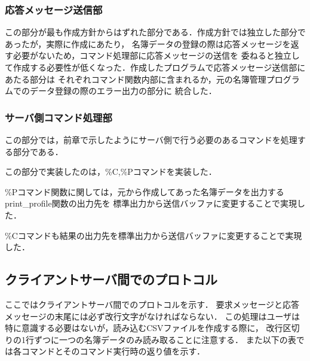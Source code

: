 \documentclass[a4paper,11pt]{jarticle}
\begin{document}
\subsubsection{応答メッセージ送信部} \label{sec:pre}
この部分が最も作成方針からはずれた部分である．作成方針では独立した部分であったが，実際に作成にあたり，
名簿データの登録の際は応答メッセージを返す必要がないため，コマンド処理部に応答メッセージの送信を
委ねると独立して作成する必要性が低くなった．作成したプログラムで応答メッセージ送信部にあたる部分は
それぞれコマンド関数内部に含まれるか，元の名簿管理プログラムでのデータ登録の際のエラー出力の部分に
統合した．

\subsubsection{サーバ側コマンド処理部} \label{sec:pre}
この部分では，前章で示したようにサーバ側で行う必要のあるコマンドを処理する部分である．

この部分で実装したのは，\%C,\%Pコマンドを実装した．%

\%Pコマンド関数に関しては，元から作成してあった名簿データを出力するprint\_profile関数の出力先を
標準出力から送信バッファに変更することで実現した．

\%Cコマンドも結果の出力先を標準出力から送信バッファに変更することで実現した．
\subsection{クライアントサーバ間でのプロトコル }
ここではクライアントサーバ間でのプロトコルを示す．
要求メッセージと応答メッセージの末尾には必ず改行文字がなければならない．
この処理はユーザは特に意識する必要はないが，読み込むCSVファイルを作成する際に，
改行区切りの1行ずつに一つの名簿データのみ読み取ることに注意する．
また以下の表では各コマンドとそのコマンド実行時の返り値を示す．
\end{document}
